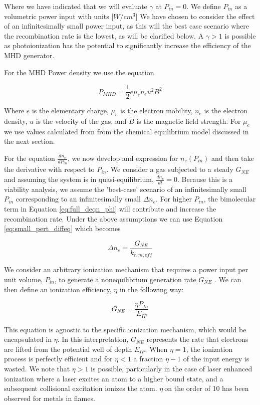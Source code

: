 Where we have indicated that we will evaluate $\gamma$ at $P_{in} = 0$. We define $P_{in}$ as a volumetric power input with units [$W/cm^3$] We have chosen to consider the effect of an infinitesimally small power input, as this will the best case scenario where the recombination rate is the lowest, as will be clarified below. A $\gamma > 1$ is possible as photoionization has the potential to significantly increase the efficiency of the MHD generator. 

For the MHD Power density we use the equation

\begin{equation}
  \label{eq:mhd_power}
P_{MHD} = \frac{1}{2} e \mu_e n_e u^2 B^2
\end{equation}

Where $e$ is the elementary charge, $\mu_e$ is the electron mobility, $n_e$ is the electron density, $u$ is the velocity of the gas, and $B$ is the magnetic field strength. For $\mu_e$ we use values calculated from from the chemical equilibrium model discussed in the next section.

For the equation $\frac{dn_{e}}{dP_{in}}$, we now develop and expression for $n_e(P_{in})$ and then take the derivative with respect to $P_{in}$. We consider a gas subjected to a steady $G_{NE}$ and assuming the system is in quasi-equilibrium, $\frac{dn_{e}}{dt} = 0$.  Because this is a viability analysis, we assume the 'best-case' scenario of an infinitesimally small $P_{in}$ corresponding to an infinitesimally small $\Delta n_{e}$. For higher $P_{in}$, the bimolecular term in Equation \ref{eq:full_deqn_phi} will contribute and increase the recombination rate. Under the above assumptions we can use Equation \ref{eq:small_pert_diffeq} which becomes

\begin{equation}
\Delta n_{e} = \frac{G_{NE}}{k_{r, m, eff}}
\end{equation}

We consider an arbitrary ionization mechanism that requires a power input per unit volume, \(P_{in}\), to generate a nonequilibrium generation rate \(G_{NE}\) . We can then define an ionization efficiency, \(\eta\) in the following way:

\begin{equation}
{G}_{NE} = \frac{\eta P_{In}}{E_{IP}}
\end{equation}


This equation is agnostic to the specific ionization mechanism, which would be encapsulated in \(\eta\). In this interpretation, \(G_{NE}\) represents the rate that electrons are lifted from the potential well of depth \(E_{IP}\). When \(\eta = 1\), the ionization process is perfectly efficient and for \(\eta < 1\) a fraction \(\eta - 1\) of the input energy is wasted. We note that \(\eta > 1\) is possible, particularly in the case of laser enhanced ionization where a laser excites an atom to a higher bound state, and a subsequent collisional excitation ionizes the atom. \(\eta\ \)on the order of 10 has been observed for metals in flames.\cite{turkOpticalDetectionLaserInduced1986}

